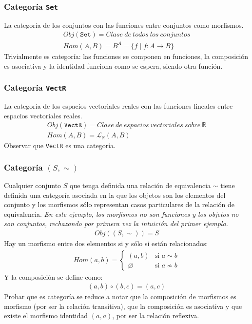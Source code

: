 \documentclass[a4paper, 11pt]{amsart}
\let\emptyset\varnothing
\newcommand{\twopartdef}[4]
{
	\left\{
		\begin{array}{ll}
			#1 & \mbox{si } #2 \\
			#3 & \mbox{si } #4
		\end{array}
	\right.
}
\theoremstyle{definition}
\theoremstyle{remark}
\numberwithin{equation}{section}
\begin{document}
    \subsubsection{Categoría \texttt{Set}}
      La categoría de los conjuntos con las funciones entre conjuntos como morfismos.
      \begin{gather*}
        Obj(\texttt{Set}) = Clase\ de\ todos\ los\ conjuntos \\
        Hom(A,B)= B^A = \{f \;|\; f: A \rightarrow B \}
      \end{gather*}
      Trivialmente es categoría: las funciones se componen en funciones, la composición es
      asociativa y la identidad funciona como se espera, siendo otra función.
      
    \subsubsection{Categoría \texttt{VectR}}
      La categoría de los espacios vectoriales reales con las funciones lineales entre
      espacios vectoriales reales.
      \begin{gather*}
        Obj(\texttt{VectR}) = Clase\ de\ espacios\ vectoriales\ sobre\ \mathbb{R} \\
        Hom(A,B)= \mathcal{L}_{\mathbb{R}}(A,B)
      \end{gather*}
      \exca Observar que \texttt{VectR} es una categoría.
    
    \subsubsection{Categoría \texttt{$(S,\sim)$}}
      Cualquier conjunto $S$ que tenga definida una relación de equivalencia $\sim$ tiene
      definida una categoría asociada en la que los objetos son los elementos del conjunto
      y los morfismos sólo representan casos particulares de la relación de equivalencia.
      \textit{En este ejemplo, los morfismos no son funciones y los objetos no son conjuntos,
      rechazando por primera vez la intuición del primer ejemplo.}
      \begin{gather*}
        Obj((S,\sim)) = S
      \end{gather*}
      Hay un morfismo entre dos elementos si y sólo si están relacionados:
      \begin{align*}
        Hom(a,b)= \twopartdef{(a,b)}{a \sim b}{\emptyset}{a \nsim b}
      \end{align*}
      Y la composición se define como:
      \begin{align*}
       (a,b) \circ (b,c) = (a,c)
      \end{align*}
      Probar que es categoría se reduce a notar que la composición de morfismos es morfismo (por
      ser la relación transitiva), que la composición es asociativa y que existe el morfismo identidad
      $(a,a)$, por ser la relación reflexiva.
     
\end{document}
